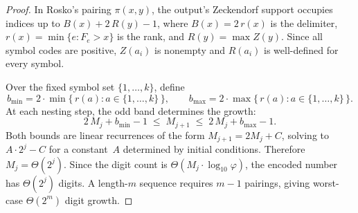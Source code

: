 \documentclass[10pt,a4paper]{amsart}
\begin{document}
\begin{proof}
In Rosko's pairing $\pi(x,y)$, the output's Zeckendorf support occupies indices up to $B(x) + 2\,R(y) - 1$, where $B(x) = 2\,r(x)$ is the delimiter, $r(x) = \min\{e : F_e > x\}$ is the rank, and $R(y) = \max Z(y)$. Since all symbol codes are positive, $Z(a_i)$ is nonempty and $R(a_i)$ is well-defined for every symbol.

Over the fixed symbol set $\{1,\ldots,k\}$, define
\[
b_{\min} = 2 \cdot \min\bigl\{\, r(a) : a \in \{1,\ldots,k\} \,\bigr\}, \qquad
b_{\max} = 2 \cdot \max\bigl\{\, r(a) : a \in \{1,\ldots,k\} \,\bigr\}.
\]
At each nesting step, the odd band determines the growth:
\[
2\,M_j + b_{\min} - 1 \;\le\; M_{j+1} \;\le\; 2\,M_j + b_{\max} - 1.
\]
Both bounds are linear recurrences of the form $M_{j+1} = 2M_j + C$, solving to $A \cdot 2^j - C$ for a constant~$A$ determined by initial conditions. Therefore $M_j = \Theta(2^j)$. Since the digit count is $\Theta(M_j \cdot \log_{10}\varphi)$, the encoded number has $\Theta(2^j)$ digits. A length-$m$ sequence requires $m-1$ pairings, giving worst-case $\Theta(2^m)$ digit growth.
\end{proof}
\end{document}
